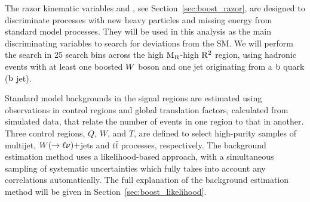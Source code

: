 The razor kinematic variables \mr and \rsq, see Section~\ref{sec:boost_razor}, are designed to
discriminate processes with new heavy particles and missing energy from standard model processes.
They will be used in this analysis as the main discriminating variables to search for deviations
from the SM. We will perform the search in 25 search bins across the high $\mathrm{M_R}$-high $\mathrm{R^2}$ region,
using hadronic events with at least one boosted $W$ boson and one jet originating from a $\mathrm{b}$
quark (\ie $\mathrm{b}$ jet). 

Standard model backgrounds in the signal regions are estimated using observations in control regions
and global translation factors, calculated from simulated data, that relate the number of events in
one region to that in another. 
Three control regions, $Q$, $W$, and $T$, are defined to select high-purity samples of multijet,
$W(\rightarrow \ell\nu)+$jets and $t\bar{t}$ processes, respectively.  
The background estimation method uses a likelihood-based approach, with a simultaneous sampling
of systematic uncertainties which fully takes into account any correlations automatically.
The full explanation of the background estimation method will be given in
Section~\ref{sec:boost_likelihood}. 



